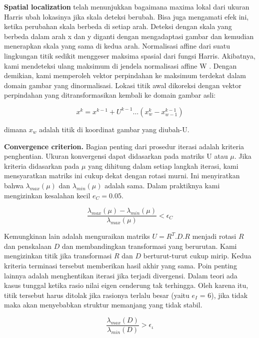 \textbf{Spatial localization} telah menunjukkan bagaimana maxima lokal dari ukuran Harris ubah lokasinya jika skala deteksi berubah. 
Bisa juga mengamati efek ini, ketika perubahan skala berbeda di setiap arah. Deteksi dengan skala yang berbeda dalam arah x dan y diganti dengan mengadaptasi gambar dan kemudian menerapkan skala yang sama di kedua arah. Normalisasi affine dari suatu lingkungan titik sedikit menggeser maksima spasial dari fungsi Harris. Akibatnya, kami mendeteksi ulang maksimum di jendela normalisasi affine W . Dengan demikian, kami memperoleh vektor perpindahan ke maksimum terdekat dalam domain gambar yang dinormalisasi. Lokasi titik awal dikoreksi 
dengan vektor perpindahan yang ditransformasikan kembali ke domain gambar asli:

\begin{equation*}
  x^{k} = x^{k-1} + U^{k-1} \dots (x_{w}^{k} - x_{w-1}^{k-1})
\end{equation*}

dimana \(x_{w}\) adalah titik di koordinat gambar yang diubah-U.

\textbf{Convergence criterion.} Bagian penting dari prosedur iterasi adalah kriteria penghentian. 
Ukuran konvergensi dapat didasarkan pada matriks U atau \(\mu\). Jika kriteria didasarkan pada \(\mu\) yang 
dihitung dalam setiap langkah iterasi, kami mensyaratkan matriks ini cukup dekat dengan rotasi murni. 
Ini menyiratkan bahwa \(\lambda_{max}(\mu)\) dan \(\lambda_{min}(\mu)\) adalah sama. 
Dalam praktiknya kami mengizinkan kesalahan kecil \(e_{C}=0.05\).

\begin{equation}
  \frac{\lambda_{max}(\mu)-\lambda_{min}(\mu)}{\lambda_{max}(\mu)} < \epsilon_{C}
\end{equation}

Kemungkinan lain adalah menguraikan matriks \(U = R^{T}.D.R\) menjadi rotasi \(R\) dan penskalaan \(D\) dan membandingkan 
transformasi yang berurutan. Kami mengizinkan titik jika transformasi \(R\) dan \(D\) berturut-turut cukup mirip. 
Kedua kriteria terminasi tersebut memberikan hasil akhir yang sama. Poin penting lainnya adalah menghentikan iterasi jika 
terjadi divergensi. Dalam teori ada kasus tunggal ketika rasio nilai eigen cenderung tak terhingga. 
Oleh karena itu, titik tersebut harus ditolak jika rasionya terlalu besar (yaitu \(e_{I}\) = 6), 
jika tidak maka akan menyebabkan struktur memanjang yang tidak stabil.

\begin{equation}
  \frac{\lambda_{max}(D)}{\lambda_{min}(D)} > \epsilon_{\iota}
\end{equation}

